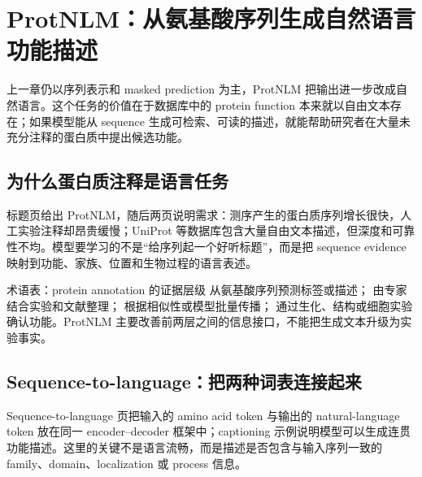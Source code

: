 \section{ProtNLM：从氨基酸序列生成自然语言功能描述}

上一章仍以序列表示和 masked prediction 为主，ProtNLM 把输出进一步改成自然语言。这个任务的价值在于数据库中的 protein function 本来就以自由文本存在；如果模型能从 sequence 生成可检索、可读的描述，就能帮助研究者在大量未充分注释的蛋白质中提出候选功能。

\subsection{为什么蛋白质注释是语言任务}

标题页给出 ProtNLM，随后两页说明需求：测序产生的蛋白质序列增长很快，人工实验注释却昂贵缓慢；UniProt 等数据库包含大量自由文本描述，但深度和可靠性不均。模型要学习的不是“给序列起一个好听标题”，而是把 sequence evidence 映射到功能、家族、位置和生物过程的语言表述。




\begin{knowledgebox}{术语表：protein annotation 的证据层级}
 从氨基酸序列预测标签或描述； 由专家结合实验和文献整理； 根据相似性或模型批量传播； 通过生化、结构或细胞实验确认功能。ProtNLM 主要改善前两层之间的信息接口，不能把生成文本升级为实验事实。
\end{knowledgebox}

\subsection{Sequence-to-language：把两种词表连接起来}

Sequence-to-language 页把输入的 amino acid token 与输出的 natural-language token 放在同一 encoder--decoder 框架中；captioning 示例说明模型可以生成连贯功能描述。这里的关键不是语言流畅，而是描述是否包含与输入序列一致的 family、domain、localization 或 process 信息。

